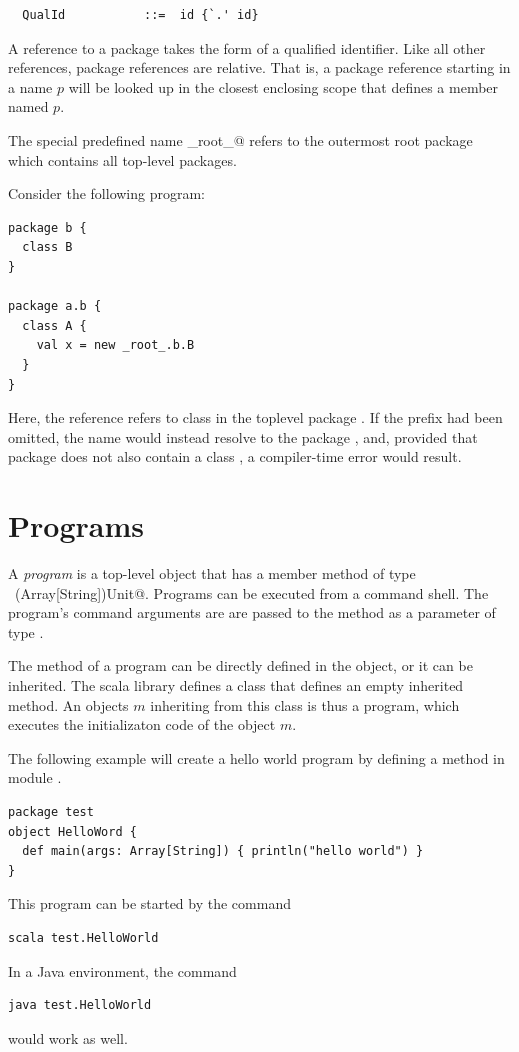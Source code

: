 \syntax\begin{lstlisting}
  QualId           ::=  id {`.' id}
\end{lstlisting}
A reference to a package takes the form of a qualified identifier.
Like all other references, package references are relative. That is, 
a package reference starting in a name $p$ will be looked up in the
closest enclosing scope that defines a member named $p$.

The special predefined name \lstinline@_root_@  refers to the
outermost root package which contains all top-level packages.  

\example\label{ex:package-ids}
Consider the following program:
\begin{lstlisting}
package b {
  class B 
}

package a.b {
  class A {
    val x = new _root_.b.B
  }
}
\end{lstlisting}  
Here, the reference  refers to class  in the
toplevel package . If the  prefix had been
omitted, the name  would instead resolve to the package
, and, provided that package does not also
contain a class , a compiler-time error would result.

\section{Programs}

A {\em program} is a top-level object that has a member method
 of type ~\lstinline@(Array[String])Unit@. Programs can be
executed from a command shell. The program's command arguments are are
passed to the  method as a parameter of type
.

The  method of a program can be directly defined in the
object, or it can be inherited. The scala library defines a class
 that defines an empty inherited  method.
An objects $m$ inheriting from this class is thus a program, 
which executes the initializaton code of the object $m$.

\example The following example will create a hello world program by defining
a method  in module .
\begin{lstlisting}
package test
object HelloWord {
  def main(args: Array[String]) { println("hello world") }
}
\end{lstlisting}

This program can be started by the command
\begin{lstlisting}
scala test.HelloWorld
\end{lstlisting}
In a Java environment, the command
\begin{lstlisting}
java test.HelloWorld
\end{lstlisting}
would work as well. 

